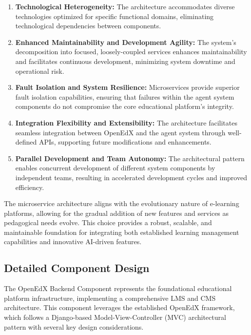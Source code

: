 \documentclass[../Main.tex]{subfiles}
\begin{document}
{{\begin{enumerate}
		\item \textbf{Technological Heterogeneity:} The architecture accommodates
			diverse technologies optimized for specific functional domains, eliminating
			technological dependencies between components.

		\item \textbf{Enhanced Maintainability and Development Agility:} The system's
			decomposition into focused, loosely-coupled services enhances maintainability
			and facilitates continuous development, minimizing system downtime and
			operational risk.

		\item \textbf{Fault Isolation and System Resilience:} Microservices provide
			superior fault isolation capabilities, ensuring that failures within the agent
			system components do not compromise the core educational platform's integrity.

		\item \textbf{Integration Flexibility and Extensibility:} The architecture
			facilitates seamless integration between OpenEdX and the agent system
			through well-defined APIs, supporting future modifications and enhancements.

		\item \textbf{Parallel Development and Team Autonomy:} The architectural
			pattern enables concurrent development of different system components by
			independent teams, resulting in accelerated development cycles and improved
			efficiency.
	\end{enumerate}

	The microservice architecture aligns with the evolutionary nature of e-learning
	platforms, allowing for the gradual addition of new features and services as
	pedagogical needs evolve. This choice provides a robust, scalable, and maintainable
	foundation for integrating both established learning management capabilities and
	innovative AI-driven features.

	\subsection{Detailed Component Design}
	\label{section:4.2.2_detailed_component_design} The OpenEdX Backend Component represents
	the foundational educational platform infrastructure, implementing a
	comprehensive LMS and CMS
	architecture. This component leverages the established OpenEdX framework,
	which follows a Django-based Model-View-Controller (MVC) architectural pattern
	with several key design considerations.

}}
\end{document}
